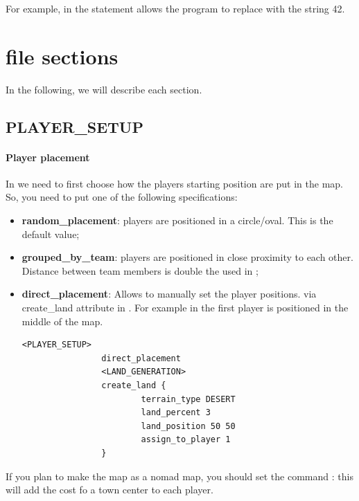     For example, in  the statement allows the program to replace  with the string 42.

    \section{ file sections}

    In the following, we will describe each section. 

    \subsection{PLAYER\_SETUP}

    \paragraph{Player placement}

    In  we need to first choose how the players starting position are put in the map. So, you need to put one of the following specifications:

    \begin{itemize}
        \item \textbf{random\_placement}: players are positioned in a circle/oval. This is the default value;
        \item \textbf{grouped\_by\_team}: players are positioned in close proximity to each other. Distance between team members is double the  used in ;
        \item \textbf{direct\_placement}: Allows to manually set the player positions. via create\_land attribute in . For example in  the first player is positioned in the middle of the map.
        
            \begin{lstlisting}[language=rms,label=rms:manualposition]
                <PLAYER_SETUP>
                direct_placement
                <LAND_GENERATION>
                create_land {
                        terrain_type DESERT
                        land_percent 3
                        land_position 50 50
                        assign_to_player 1
                }
            \end{lstlisting}
        
    \end{itemize}

    If you plan to make the map as a nomad map, you should set the command : this will add the cost fo a town center to each player.

